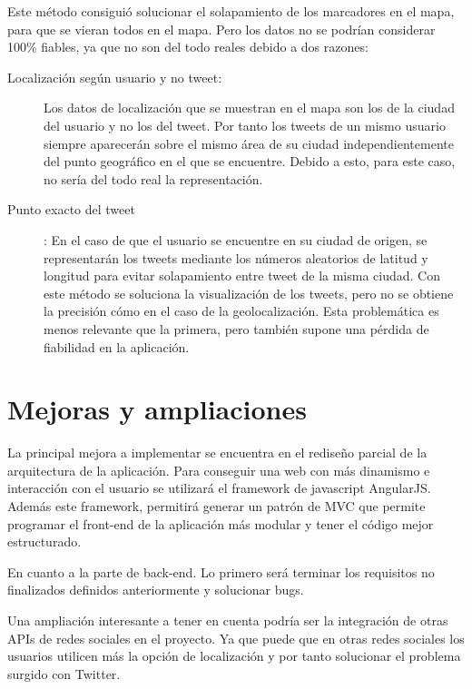 Este método consiguió solucionar el solapamiento de los marcadores en el mapa, para que se vieran todos en el mapa. Pero los datos no se podrían considerar 100\% fiables, ya que no son del todo reales debido a dos razones:

\begin{description}

\item [Localización según usuario y no tweet:] Los datos de localización que se muestran en el mapa son los de la ciudad del usuario y no los del tweet. Por tanto los tweets de un mismo usuario siempre aparecerán sobre el mismo área de su ciudad independientemente del punto geográfico en el que se encuentre. Debido a esto, para este caso, no sería del todo real la representación.

\item [Punto exacto del tweet]: En el caso de que el usuario se encuentre en su ciudad de origen, se representarán los tweets mediante los números aleatorios de latitud y longitud para evitar solapamiento entre tweet de la misma ciudad. Con este método se soluciona la visualización de los tweets, pero no se obtiene la precisión cómo en el caso de la geolocalización. Esta problemática es menos relevante que la primera, pero también supone una pérdida de fiabilidad en la aplicación.

\end{description}


\section{Mejoras y ampliaciones}

La principal mejora a implementar se encuentra en el rediseño parcial de la arquitectura de la aplicación. Para conseguir una web con más dinamismo e interacción con el usuario se utilizará el framework de javascript AngularJS. Además este framework, permitirá generar un patrón de MVC que permite programar el front-end de la aplicación más modular y tener el código mejor estructurado.

\vspace{5 mm}

En cuanto a la parte de back-end. Lo primero será terminar los requisitos no finalizados definidos anteriormente y solucionar bugs.

Una ampliación interesante a tener en cuenta podría ser la integración de otras APIs de redes sociales en el proyecto. Ya que puede que en otras redes sociales los usuarios utilicen más la opción de localización y por tanto solucionar el problema surgido con Twitter.


